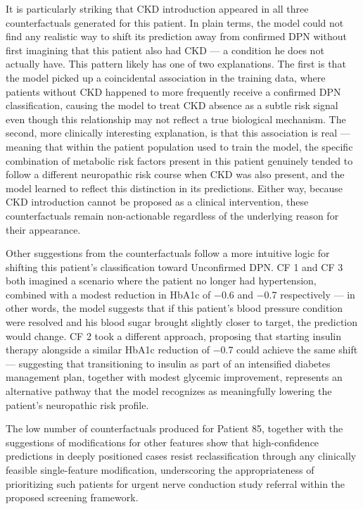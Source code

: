 \documentclass[pdflatex,sn-vancouver-num]{sn-jnl}
\begin{document}
It is particularly striking that CKD introduction appeared in all three counterfactuals generated for this patient. In plain terms, the model could not find any realistic way to shift its prediction away from confirmed DPN without first imagining that this patient also had CKD — a condition he does not actually have. This pattern likely has one of two explanations. The first is that the model picked up a coincidental association in the training data, where patients without CKD happened to more frequently receive a confirmed DPN classification, causing the model to treat CKD absence as a subtle risk signal even though this relationship may not reflect a true biological mechanism. The second, more clinically interesting explanation, is that this association is real — meaning that within the patient population used to train the model, the specific combination of metabolic risk factors present in this patient genuinely tended to follow a different neuropathic risk course when CKD was also present, and the model learned to reflect this distinction in its predictions. Either way, because CKD introduction cannot be proposed as a clinical intervention, these counterfactuals remain non-actionable regardless of the underlying reason for their appearance.

Other suggestions from the counterfactuals follow a more intuitive logic for shifting this patient's classification toward Unconfirmed DPN. CF 1 and CF 3 both imagined a scenario where the patient no longer had hypertension, combined with a modest reduction in HbA1c of −0.6 and −0.7 respectively — in other words, the model suggests that if this patient's blood pressure condition were resolved and his blood sugar brought slightly closer to target, the prediction would change. CF 2 took a different approach, proposing that starting insulin therapy alongside a similar HbA1c reduction of −0.7 could achieve the same shift — suggesting that transitioning to insulin as part of an intensified diabetes management plan, together with modest glycemic improvement, represents an alternative pathway that the model recognizes as meaningfully lowering the patient's neuropathic risk profile. 

The low number of counterfactuals produced for Patient 85, together with the suggestions of modifications for other features show that high-confidence predictions in deeply positioned cases resist reclassification through any clinically feasible single-feature modification, underscoring the appropriateness of prioritizing such patients for urgent nerve conduction study referral within the proposed screening framework.
\end{document}
